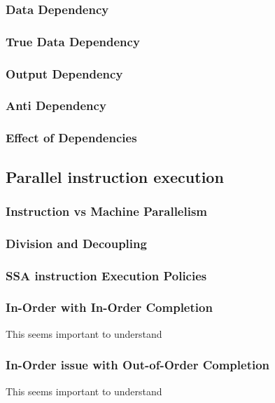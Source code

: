 \subsubsection{Data Dependency}

\subsubsection{True Data Dependency}

\subsubsection{Output Dependency}

\subsubsection{Anti Dependency}

\subsubsection{Effect of Dependencies}

\subsection{Parallel instruction execution}

\subsubsection{Instruction vs Machine Parallelism}

\subsubsection{Division and Decoupling}

\subsubsection{SSA instruction Execution Policies}

\subsubsection{In-Order with In-Order Completion}
This seems important to understand

\subsubsection{In-Order issue with Out-of-Order Completion}
This seems important to understand
